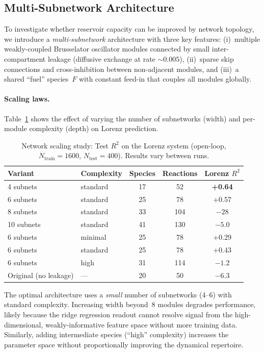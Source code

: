 \documentclass[11pt,twocolumn]{article}
\begin{document}
\subsection{Multi-Subnetwork Architecture}
\label{sec:multisubnet}

To investigate whether reservoir capacity can be improved by network topology,
we introduce a \emph{multi-subnetwork} architecture with three key features:
(i)~multiple weakly-coupled Brusselator oscillator modules connected by small
inter-compartment leakage (diffusive exchange at rate $\sim\!0.005$),
(ii)~sparse skip connections and cross-inhibition between non-adjacent modules,
and (iii)~a shared ``fuel'' species~$F$ with constant feed-in that couples
all modules globally.

\paragraph{Scaling laws.}
Table~\ref{tab:scaling} shows the effect of varying the number of subnetworks
(width) and per-module complexity (depth) on Lorenz prediction.

\begin{table}[t]
\centering
\caption{Network scaling study: Test $R^2$ on the Lorenz system (open-loop,
  $N_{\text{train}}=1600$, $N_{\text{test}}=400$).  Results vary between runs.}
\label{tab:scaling}
\small
\begin{tabular}{@{}llccc@{}}
\hline
Variant & Complexity & Species & Reactions & Lorenz $R^2$ \\
\hline
4 subnets  & standard & 17 & 52  & \textbf{+0.64} \\
6 subnets  & standard & 25 & 78  & +0.57 \\
8 subnets  & standard & 33 & 104 & $-28$ \\
10 subnets & standard & 41 & 130 & $-5.0$ \\
\hline
6 subnets  & minimal  & 25 & 78  & +0.29 \\
6 subnets  & standard & 25 & 78  & +0.43 \\
6 subnets  & high     & 31 & 114 & $-1.2$ \\
\hline
Original (no leakage) & --- & 20 & 50 & $-6.3$ \\
\hline
\end{tabular}
\end{table}

The optimal architecture uses a \emph{small} number of subnetworks (4--6)
with standard complexity.  Increasing width beyond~8 modules degrades
performance, likely because the ridge regression readout cannot resolve
signal from the high-dimensional, weakly-informative feature space without
more training data.  Similarly, adding intermediate species (``high''
complexity) increases the parameter space without proportionally improving
the dynamical repertoire.
\end{document}
